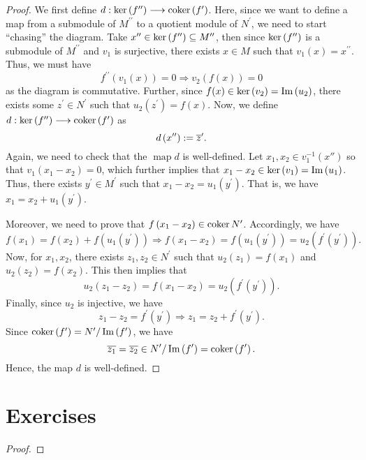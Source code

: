 \begin{proof}
    We first define $d: {\operatorname{\text{ker\/}}}\left(f^{\prime \prime}\right) \longrightarrow {\operatorname{\text{coker\/}}}\left(f^{\prime}\right)$. Here, since we want to define a map from a submodule of $M^{\prime \prime}$ to a quotient module of $N^{\prime}$, we need to start ``chasing'' the diagram. Take $x^{\prime \prime} \in {\operatorname{\text{ker\/}}}\left(f^{\prime \prime}\right) \subseteq M''$, then since ${\operatorname{\text{ker\/}}}\left(f^{\prime \prime}\right)$ is a submodule of $M^{\prime \prime}$ and $v_{1}$ is surjective, there exists $x \in M$ such that $v_{1}(x)=x^{\prime \prime}$. Thus, we must have 
    \[f^{\prime \prime}\left(v_{1}(x)\right)=0 \Longrightarrow v_{2}(f(x))=0\]
    as the diagram is commutative. Further, since $f(x) \in {\operatorname{\text{ker\/}}}\left(v_{2}\right)=\operatorname{Im}\left(u_{2}\right)$, there exists some $z^{\prime} \in N^{\prime}$ such that $u_{2}\left(z^{\prime}\right)=f(x)$. Now, we define $d: {\operatorname{\text{ker\/}}}\left(f^{\prime \prime}\right) \longrightarrow {\operatorname{\text{coker\/}}}\left(f^{\prime}\right)$ as
    \[d\left(x^{\prime \prime}\right):=\overline{z}^{\prime}.\]
    Again, we need to check that the $\operatorname{map} d$ is well-defined. Let $x_{1}, x_{2} \in v_1^{-1}(x'')$ so that $v_{1}\left(x_{1}-x_{2}\right)=0$, which further implies that $x_{1}-x_{2} \in {\operatorname{\text{ker\/}}}\left(v_{1}\right)=\operatorname{Im}\left(u_{1}\right)$. Thus, there exists $y^{\prime} \in M^{\prime}$ such that $x_{1}-x_{2}=u_{1}\left(y^{\prime}\right)$. That is, we have $x_{1}=x_{2}+u_{1}\left(y^{\prime}\right)$.
    
    Moreover, we need to prove that $f\left(x_{1}-x_{2}\right) \in \operatorname{\text{coker\/}}{N^{\prime}}$. Accordingly, we have 
    \[
f\left(x_{1}\right)=f\left(x_{2}\right)+f\left(u_{1}\left(y^{\prime}\right)\right) \Longrightarrow f\left(x_{1}-x_{2}\right)=f\left(u_{1}\left(y^{\prime}\right)\right)=u_{2}\left(f^{\prime}\left(y^{\prime}\right)\right).
    \]
    Now, for $x_{1}, x_2$, there exists $z_{1}, z_{2} \in N^{\prime}$ such that $u_{2}\left(z_{1}\right)=f\left(x_{1}\right)$ and $u_{2}\left(z_{2}\right)=f\left(x_{2}\right)$.
    This then implies that 
    \[u_{2}\left(z_{1}-z_{2}\right)=f\left(x_{1}-x_{2}\right)=u_{2}\left(f^{\prime}\left(y^{\prime}\right)\right).\]
    Finally, since $u_{2}$ is injective, we have 
    \[z_{1}-z_{2}=f^{\prime}\left(y^{\prime}\right) \Longrightarrow z_{1}=z_{2}+f^{\prime}\left(y^{\prime}\right).\]
    Since $\operatorname{\text{coker\/}}\left(f^{\prime}\right) = N^{\prime} / \operatorname{Im}\left(f^{\prime}\right)$, we have
    \[
    \overline{z_{1}}=\overline{z_{2}} \in N^{\prime} / \operatorname{Im}\left(f^{\prime}\right)={\operatorname{\text{coker\/}}}\left(f^{\prime}\right).\]
    Hence, the map $d$ is well-defined.
\end{proof}


\newpage
\section{Exercises}
\begin{exercise}\label{ex: c43-}
    
\end{exercise}
\begin{proof}
    
\end{proof}

\newpage
